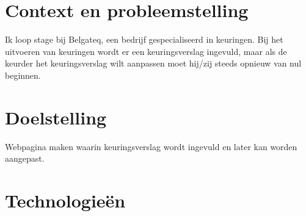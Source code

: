 

\section{Context en probleemstelling}%
\label{vst:context}


Ik loop stage bij Belgateq, een bedrijf gespecialiseerd in keuringen. Bij het uitvoeren van keuringen wordt er een keuringsverslag ingevuld, maar als de keurder het keuringsverslag wilt aanpassen moet hij/zij steeds opnieuw van nul beginnen. 


\section{Doelstelling}%
\label{vst:doelstelling}


Webpagina maken waarin keuringsverslag wordt ingevuld en later kan worden aangepast.


\section{Technologieën}%
\label{vst:technologieen}

